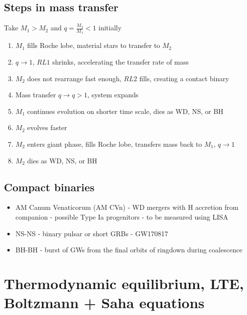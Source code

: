 \documentclass{article}
\begin{document}
\subsection{Steps in mass transfer}
Take $M_1 > M_2$ and $q = \frac{M_2}{M_1} < 1$ initially

\begin{enumerate}
    \item $M_1$ fills Roche lobe, material stars to transfer to $M_2$

    \item $q \to 1$, $RL1$ shrinks, accelerating the transfer rate of mass

    \item $M_2$ does not rearrange fast enough, $RL2$ fills, creating a contact binary

    \item Mass transfer $q \to q > 1$, system expands

    \item $M_1$ continues evolution on shorter time scale, dies as WD, NS, or BH

    \item $M_2$ evolves faster

    \item $M_2$ enters giant phase, fills Roche lobe, transfers mass back to $M_1$, $q \to 1$

    \item $M_2$ dies as WD, NS, or BH
\end{enumerate}

\subsection{Compact binaries}

\begin{itemize}
    \item AM Canum Venaticorum (AM CVn) - WD mergers with H accretion from companion - possible Type Ia progenitors - to be measured using LISA 

    \item NS-NS - binary pulsar or short GRBs - GW170817

    \item BH-BH - burst of GWs from the final orbits of ringdown during coalescence 
\end{itemize}


\section{Thermodynamic equilibrium, LTE, Boltzmann + Saha equations}
\end{document}
